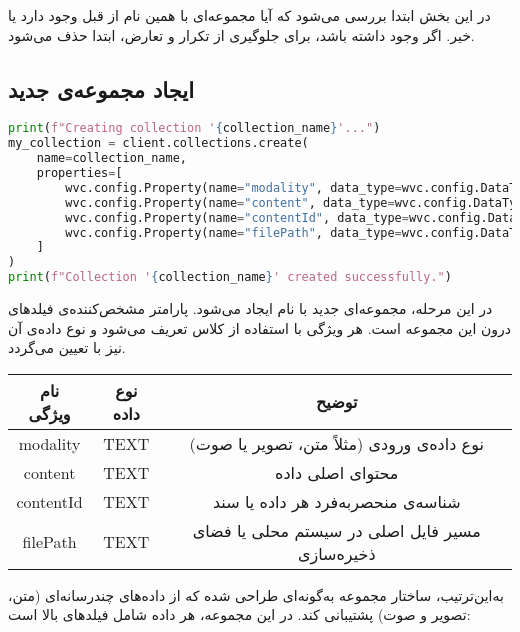 \documentclass{article}
\begin{document}
در این بخش ابتدا بررسی می‌شود که آیا مجموعه‌ای با همین نام از قبل وجود دارد یا خیر.  
اگر وجود داشته باشد، برای جلوگیری از تکرار و تعارض، ابتدا حذف می‌شود.


\subsection{ایجاد مجموعه‌ی جدید}

\begin{latin}
\begin{lstlisting}[language=python]
print(f"Creating collection '{collection_name}'...")
my_collection = client.collections.create(
    name=collection_name,
    properties=[
        wvc.config.Property(name="modality", data_type=wvc.config.DataType.TEXT),
        wvc.config.Property(name="content", data_type=wvc.config.DataType.TEXT),
        wvc.config.Property(name="contentId", data_type=wvc.config.DataType.TEXT),
        wvc.config.Property(name="filePath", data_type=wvc.config.DataType.TEXT),
    ]
)
print(f"Collection '{collection_name}' created successfully.")
\end{lstlisting}
\end{latin}

در این مرحله، مجموعه‌ای جدید با نام  ایجاد می‌شود.  
پارامتر  مشخص‌کننده‌ی فیلدهای درون این مجموعه است.  
هر ویژگی با استفاده از کلاس  تعریف می‌شود و نوع داده‌ی آن نیز با  تعیین می‌گردد.

\begin{center}
\begin{tabular}{|c|c|c|}
\hline
\textbf{نام ویژگی} & \textbf{نوع داده} & \textbf{توضیح} \\
\hline
modality & TEXT & نوع داده‌ی ورودی (مثلاً متن، تصویر یا صوت) \\
\hline
content & TEXT & محتوای اصلی داده \\
\hline
contentId & TEXT & شناسه‌ی منحصربه‌فرد هر داده یا سند \\
\hline
filePath & TEXT & مسیر فایل اصلی در سیستم محلی یا فضای ذخیره‌سازی \\
\hline
\end{tabular}
\end{center}

به‌این‌ترتیب، ساختار مجموعه به‌گونه‌ای طراحی شده که از داده‌های چندرسانه‌ای (متن، تصویر و صوت) پشتیبانی کند.  
در این مجموعه، هر داده شامل فیلدهای بالا است:
\end{document}
